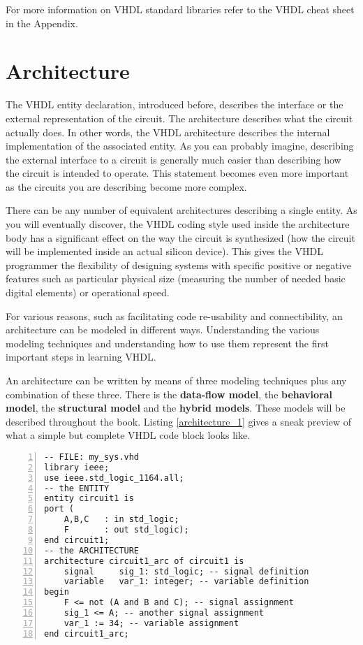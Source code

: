 For more information on VHDL standard libraries refer to the VHDL cheat sheet in the Appendix.

\section{Architecture}
The VHDL entity declaration, introduced before, describes the interface or the external representation of the circuit. The architecture describes what the circuit actually does. In other words, the VHDL architecture describes the internal implementation of the associated entity. As you can probably imagine, describing the external interface to a circuit is generally much easier than describing how the circuit is intended to operate. This statement becomes even more important as the circuits you are describing become more complex.

There can be any number of equivalent architectures describing a single entity. As you will eventually discover, the VHDL coding style used inside the architecture body has a significant effect on the way the circuit is synthesized (how the circuit will be implemented inside an actual silicon device). This gives the VHDL programmer the flexibility of designing systems with specific positive or negative features such as particular physical size (measuring the number of needed basic digital elements) or operational speed.

For various reasons, such as facilitating code re-usability and connectibility, an architecture can be modeled in different ways. Understanding the various modeling techniques and understanding how to use them represent the first important steps in learning VHDL.

An architecture can be written by means of three modeling techniques plus any combination of these three. There is the \textbf{data-flow model}, the \textbf{behavioral model}, the \textbf{structural model} and the \textbf{hybrid models}. These models will be described throughout the book. Listing \ref{architecture_1} gives a sneak preview of what a simple but complete VHDL code block looks like.
\begin{lstlisting}[numbers=left, label=architecture_1, caption=Example of a simple VHDL block.]
-- FILE: my_sys.vhd
library ieee;
use ieee.std_logic_1164.all;
-- the ENTITY
entity circuit1 is
port (
    A,B,C   : in std_logic;
    F       : out std_logic);
end circuit1;
-- the ARCHITECTURE
architecture circuit1_arc of circuit1 is
	signal     sig_1: std_logic; -- signal definition
	variable   var_1: integer; -- variable definition
begin
	F <= not (A and B and C); -- signal assignment
	sig_1 <= A; -- another signal assignment
	var_1 := 34; -- variable assignment
end circuit1_arc;
\end{lstlisting}
